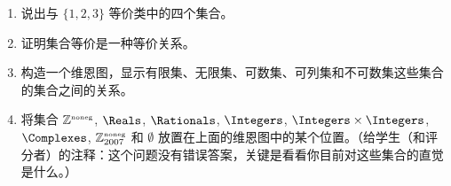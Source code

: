 \begin{enumerate}
    \item 
    说出与 $\{1, 2, 3\}$ 等价类中的四个集合。
    \wbitemsep
    
    \item 
    证明集合等价是一种等价关系。
    
    \wbvfill
    
    \workbookpagebreak
    
    \item 
    构造一个维恩图，显示有限集、无限集、可数集、可列集和不可数集这些集合的集合之间的关系。
    \wbvfill
    
    \item 
    将集合 ${\mathbb Z}^{\mbox{\tiny noneg}}$, $\Reals$, $\Rationals$, $\Integers$, $\Integers \times \Integers$, $\Complexes$, ${\mathbb Z}^{\mbox{\tiny noneg}}_{2007}$ 和 $\emptyset$ 放置在上面的维恩图中的某个位置。（给学生（和评分者）的注释：这个问题没有错误答案，关键是看看你目前对这些集合的直觉是什么。）
    
    \wbvfill
    
    \end{enumerate}
     

